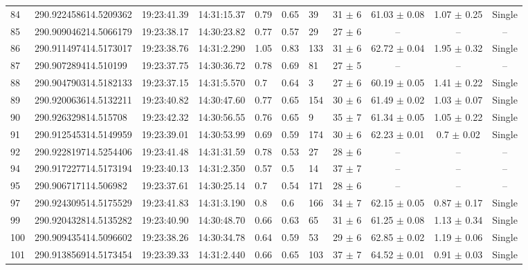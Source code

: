 \begin{table}[htbp!]
\begin{tabular}{llllllllccc}
84  &  290.922458614.5209362  &  19:23:41.39  &  14:31:15.37  &  0.79  &  0.65  &  39  &  31 $\pm$ 6  &  61.03 $\pm$ 0.08  &  1.07 $\pm$ 0.25  &  Single \\
85  &  290.909046214.5066179  &  19:23:38.17  &  14:30:23.82  &  0.77  &  0.57  &  29  &  27 $\pm$ 6  &  --  &  --  &  -- \\
86  &  290.911497414.5173017  &  19:23:38.76  &  14:31:2.290  &  1.05  &  0.83  &  133  &  31 $\pm$ 6  &  62.72 $\pm$ 0.04  &  1.95 $\pm$ 0.32  &  Single \\
87  &  290.907289414.510199  &  19:23:37.75  &  14:30:36.72  &  0.78  &  0.69  &  81  &  27 $\pm$ 5  &  --  &  --  &  -- \\
88  &  290.904790314.5182133  &  19:23:37.15  &  14:31:5.570  &  0.7  &  0.64  &  3  &  27 $\pm$ 6  &  60.19 $\pm$ 0.05  &  1.41 $\pm$ 0.22  &  Single \\
89  &  290.920063614.5132211  &  19:23:40.82  &  14:30:47.60  &  0.77  &  0.65  &  154  &  30 $\pm$ 6  &  61.49 $\pm$ 0.02  &  1.03 $\pm$ 0.07  &  Single \\
90  &  290.926329814.515708  &  19:23:42.32  &  14:30:56.55  &  0.76  &  0.65  &  9  &  35 $\pm$ 7  &  61.34 $\pm$ 0.05  &  1.05 $\pm$ 0.22  &  Single \\
91  &  290.912545314.5149959  &  19:23:39.01  &  14:30:53.99  &  0.69  &  0.59  &  174  &  30 $\pm$ 6  &  62.23 $\pm$ 0.01  &  0.7 $\pm$ 0.02  &  Single \\
92  &  290.922819714.5254406  &  19:23:41.48  &  14:31:31.59  &  0.78  &  0.53  &  27  &  28 $\pm$ 6  &  --  &  --  &  -- \\
94  &  290.917227714.5173194  &  19:23:40.13  &  14:31:2.350  &  0.57  &  0.5  &  14  &  37 $\pm$ 7  &  --  &  --  &  -- \\
95  &  290.906717114.506982  &  19:23:37.61  &  14:30:25.14  &  0.7  &  0.54  &  171  &  28 $\pm$ 6  &  --  &  --  &  -- \\
97  &  290.924309514.5175529  &  19:23:41.83  &  14:31:3.190  &  0.8  &  0.6  &  166  &  34 $\pm$ 7  &  62.15 $\pm$ 0.05  &  0.87 $\pm$ 0.17  &  Single \\
99  &  290.920432814.5135282  &  19:23:40.90  &  14:30:48.70  &  0.66  &  0.63  &  65  &  31 $\pm$ 6  &  61.25 $\pm$ 0.08  &  1.13 $\pm$ 0.34  &  Single \\
100  &  290.909435414.5096602  &  19:23:38.26  &  14:30:34.78  &  0.64  &  0.59  &  53  &  29 $\pm$ 6  &  62.85 $\pm$ 0.02  &  1.19 $\pm$ 0.06  &  Single \\
101  &  290.913856914.5173454  &  19:23:39.33  &  14:31:2.440  &  0.66  &  0.65  &  103  &  37 $\pm$ 7  &  64.52 $\pm$ 0.01  &  0.91 $\pm$ 0.03  &  Single \\

\end{tabular}
\end{table}
